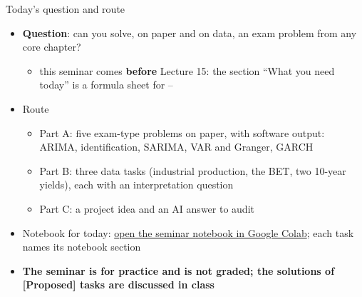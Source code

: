 \begin{frame}{Today's question and route}
\itemsize{\small}
\begin{itemize}
    \item \textbf{Question}: can you solve, on paper and on data, an exam problem from any core chapter?
    \begin{itemize}
        \item this seminar comes \textbf{before} Lecture 15: the section ``What you need today'' is a formula sheet for --
    \end{itemize}
    \item Route
    \begin{itemize}
        \item Part A: five exam-type problems on paper, with software output: ARIMA, identification, SARIMA, VAR and Granger, GARCH
        \item Part B: three data tasks (industrial production, the BET, two 10-year yields), each with an interpretation question
        \item Part C: a project idea and an AI answer to audit
    \end{itemize}
    \item Notebook for today: \href{\nb}{open the seminar notebook in Google Colab}; each task names its notebook section
    \item \textbf{The seminar is for practice and is not graded; the solutions of [Proposed] tasks are discussed in class}
\end{itemize}
\end{frame}

